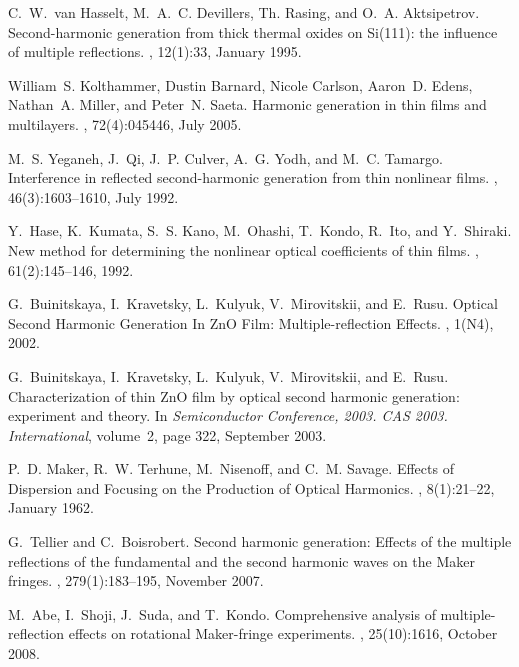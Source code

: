 \documentclass[aps,prb,10pt,showpacs,letterpaper,twocolumn]{revtex4-1}
\begin{document}
\begin{thebibliography}{10}
C.~W.~van Hasselt, M.~A.~C. Devillers, Th. Rasing, and O.~A. Aktsipetrov.
\newblock Second-harmonic generation from thick thermal oxides on {Si}(111):
  the influence of multiple reflections.
, 12(1):33, January 1995.

William~S. Kolthammer, Dustin Barnard, Nicole Carlson, Aaron~D. Edens,
  Nathan~A. Miller, and Peter~N. Saeta.
\newblock Harmonic generation in thin films and multilayers.
, 72(4):045446, July 2005.

M.~S. Yeganeh, J.~Qi, J.~P. Culver, A.~G. Yodh, and M.~C. Tamargo.
\newblock Interference in reflected second-harmonic generation from thin
  nonlinear films.
, 46(3):1603--1610, July 1992.

Y.~Hase, K.~Kumata, S.~S. Kano, M.~Ohashi, T.~Kondo, R.~Ito, and Y.~Shiraki.
\newblock New method for determining the nonlinear optical coefficients of thin
  films.
, 61(2):145--146, 1992.

G.~Buinitskaya, I.~Kravetsky, L.~Kulyuk, V.~Mirovitskii, and E.~Rusu.
\newblock Optical {Second} {Harmonic} {Generation} {In} {ZnO} {Film}:
  {Multiple}-reflection {Effects}.
, 1(N4), 2002.

G.~Buinitskaya, I.~Kravetsky, L.~Kulyuk, V.~Mirovitskii, and E.~Rusu.
\newblock Characterization of thin {ZnO} film by optical second harmonic
  generation: experiment and theory.
\newblock In {\em Semiconductor Conference, 2003. CAS 2003. International},
  volume~2, page 322, September 2003.

P.~D. Maker, R.~W. Terhune, M.~Nisenoff, and C.~M. Savage.
\newblock Effects of {Dispersion} and {Focusing} on the {Production} of
  {Optical} {Harmonics}.
, 8(1):21--22, January 1962.

G.~Tellier and C.~Boisrobert.
\newblock Second harmonic generation: {Effects} of the multiple reflections of
  the fundamental and the second harmonic waves on the {Maker} fringes.
, 279(1):183--195, November 2007.

M.~Abe, I.~Shoji, J.~Suda, and T.~Kondo.
\newblock Comprehensive analysis of multiple-reflection effects on rotational
  {Maker}-fringe experiments.
, 25(10):1616, October 2008.


\end{thebibliography}
\end{document}
